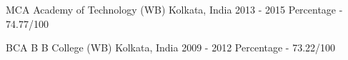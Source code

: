 

\begin{cventries}

  \cventry
    {MCA} %
    {Academy of Technology (WB)} %
    {Kolkata, India} %
    {2013 - 2015} %
    {Percentage - 74.77/100}
    {
      \begin{cvitems} %
      \item {}
      \end{cvitems}
    }

    
  \cventry
    {BCA} %
    {B B College (WB) } %
    {Kolkata, India} %
    {2009 - 2012} %
    {Percentage - 73.22/100}
    {
      \begin{cvitems} %
      \end{cvitems}
    }

\end{cventries}

